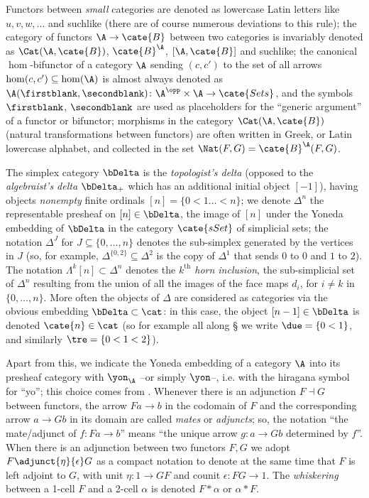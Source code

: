 Functors between \emph{small} categories are denoted as lowercase Latin letters like $u,v,w,\dots$ and suchlike (there are of course numerous deviations to this rule); the category of functors $\A\to \cate{B}$ between two categories is invariably denoted as $\Cat(\A,\cate{B})$, $\cate{B}^{\A}$, $[\A,\cate{B}]$ and suchlike; the canonical $\hom$\hyp{}bifunctor of a category $\A$ sending $(c,c')$ to the set of all arrows $\hom(c,c')\subseteq\hom(\A)$ is almost always denoted as $\A(\firstblank,\secondblank)\colon \A^\opp\times\A\to\cate{Sets}$, and the symbols $\firstblank$, $\secondblank$ are used as placeholders for the ``generic argument'' of a functor or bifunctor; morphisms in the category $\Cat(\A,\cate{B})$ (\ie natural transformations between functors) are often written in Greek, or Latin lowercase alphabet, and collected in the set $\Nat(F,G) = \cate{B}^{\A}(F,G)$.

The simplex category $\bDelta$ is the \emph{topologist's delta} (opposed to the \emph{algebraist's delta} $\bDelta_+$ which has an additional initial object $[-1]$), having objects \emph{nonempty} finite ordinals $[n]=\{0<1\dots<n\}$; we denote $\Delta^n$ the representable presheaf on $[n]\in\bDelta$, \ie the image of $[n]$ under the Yoneda embedding of $\bDelta$ in the category $\cate{sSet}$ of simplicial sets; the notation $\Delta^J$ for $J\subseteq \{0,\dots,n\}$ denotes the sub\hyp{}simplex generated by the vertices in $J$ (so, for example, $\Delta^{\{0,2\}} \subseteq \Delta^2$ is the copy of $\Delta^1$ that sends $0$ to $0$ and $1$ to $2$). The notation $\Lambda^k[n]\subset \Delta^n$ denotes the \emph{$k^\text{th}$ horn inclusion}, \ie the sub\hyp{}simplicial set of $\Delta^n$ resulting from the union of all the images of the face maps $d_i$, for $i\neq k$ in $\{0,\dots,n\}$. More often the objects of $\Delta$ are considered as categories via the obvious embedding $\bDelta\subset\cat$: in this case, the object $[n-1]\in\bDelta$ is denoted $\cate{n}\in\cat$ (so for example all along § we write $\due = \{0 < 1\}$, and similarly $\tre = \{0<1<2\}$).

Apart from this, we indicate the Yoneda embedding of a category $\A$ into its presheaf category with $\yon_\A$ --or simply $\yon$--, i.e\@. with the hiragana symbol for ``yo''; this choice comes from \cite{Libland2015}. Whenever there is an adjunction $F\dashv G$ between functors, the arrow $Fa\to b$ in the codomain of $F$ and the corresponding arrow $a\to Gb$ in its domain are called \emph{mates} or \emph{adjuncts}; so, the notation ``the mate/adjunct of $f\colon Fa\to b$'' means ``the unique arrow $g\colon a\to Gb$ determined by $f$''. When there is an adjunction between two functors $F,G$ we adopt $F\adjunct{\eta}{\epsilon}G$ as a compact notation to denote at the same time that $F$ is left adjoint to $G$, with unit $\eta \colon 1 \to GF$ and counit $\epsilon\colon FG\to 1$. The \emph{whiskering} between a 1-cell $F$ and a 2-cell $\alpha$ is denoted $F * \alpha$ or $\alpha * F$.
